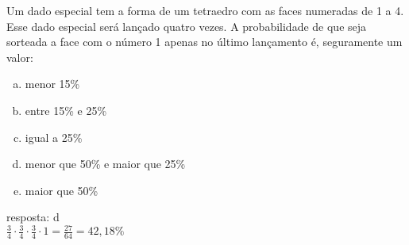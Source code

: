 \begin{ex}
 Um dado especial tem a forma de um tetraedro com as faces numeradas de 1 a 4. Esse dado especial será lançado quatro vezes. A probabilidade de que seja sorteada a face com o número 1 apenas no último lançamento é, seguramente um valor:
    \begin{enumerate}[(a)]
    \item menor 15\%
    \item entre 15\% e 25\%
    \item igual a 25\%
    \item menor que 50\% e maior que 25\%
    \item maior que 50\%
    \end{enumerate}
      \begin{sol}
        resposta: d \\
        $\frac{3}{4}\cdot\frac{3}{4}\cdot\frac{3}{4}\cdot1=\frac{27}{64}=42,18\%$
      \end{sol}
\end{ex}